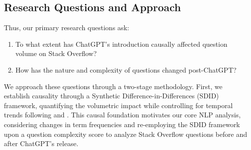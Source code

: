 


\subsection{Research Questions and Approach}
Thus, our primary research questions ask: 
\begin{enumerate}
    \item To what extent has ChatGPT's introduction causally affected question volume on Stack Overflow?
    \item How has the nature and complexity of questions changed post-ChatGPT?
\end{enumerate}

We approach these questions through a two-stage methodology. First, we establish causality through a Synthetic Difference-in-Differences (SDID) framework, quantifying the volumetric impact while controlling for temporal trends following \textcite{arkhangelsky_synthetic_2021} and \textcite{clarke_synthetic_2023}. This causal foundation motivates our core NLP analysis, considering changes in term frequencies and re-employing the SDID framework upon a question complexity score to analyze Stack Overflow questions before and after ChatGPT's release.